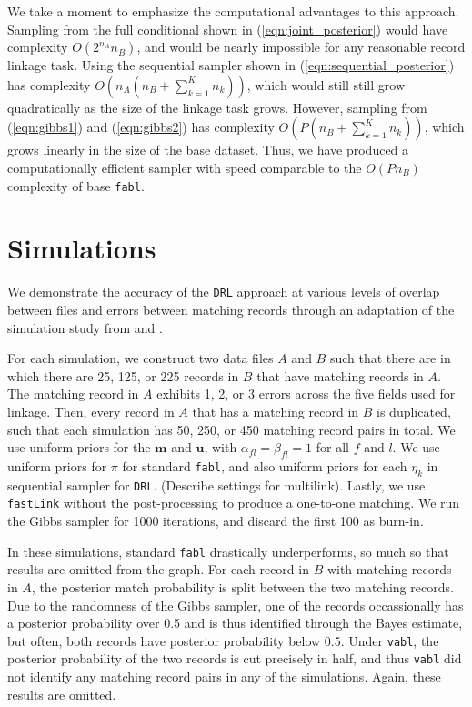 \documentclass[12pt,letterpaper]{article}
\newcommand{\1}[1]{\mathbb{I}\!\left[#1\right]} %
\def \brian#1{{\color{red} (#1)}}
\begin{document}
We take a moment to emphasize the computational advantages to this approach. Sampling from the full conditional shown in (\ref{eqn:joint_posterior}) would have complexity $O(2^{n_A}n_B)$, and would be nearly impossible for any reasonable record linkage task. Using the sequential sampler shown in (\ref{eqn:sequential_posterior}) has complexity $O\left(n_A (n_B + \sum_{k=1}^K n_k)\right)$, which would still still grow quadratically as the size of the linkage task grows. However, sampling from (\ref{eqn:gibbs1}) and (\ref{eqn:gibbs2}) has complexity $O\left(P (n_B + \sum_{k=1}^K n_k)\right)$, which grows linearly in the size of the base dataset. Thus, we have produced a computationally efficient sampler with speed comparable to the $O(P n_B)$ complexity of base \texttt{fabl}.

\section{Simulations}\label{sec:simulations}

We demonstrate the accuracy of the \texttt{DRL} approach at various levels of overlap between files and errors between matching records through an adaptation of the simulation study from \cite{sadinle_bayesian_2017} and \cite{kundinger_2023}. 

For each simulation, we construct two data files $A$ and $B$ such that there are in which there are 25, 125, or 225 records in $B$ that have matching records in $A$. The matching record in $A$ exhibits 1, 2, or 3 errors across the five fields used for linkage. Then, every record in $A$ that has a matching record in $B$ is duplicated, such that each simulation has 50, 250, or 450 matching record pairs in total. We use uniform priors for the $\bm{m}$ and $\bm{u}$, with $\alpha_{fl} = \beta_{fl} = 1$ for all $f$ and $l$. We use uniform priors for $\pi$ for standard \texttt{fabl}, and also uniform priors for each $\eta_k$ in sequential sampler for \texttt{DRL}. \brian{Describe settings for multilink}. Lastly, we use \texttt{fastLink} without the post-processing to produce a one-to-one matching. We run the Gibbs sampler for 1000 iterations, and discard the first 100 as burn-in.

In these simulations, standard \texttt{fabl} drastically underperforms, so much so that results are omitted from the graph. For each record in $B$ with matching records in $A$, the posterior match probability is split between the two matching records. Due to the randomness of the Gibbs sampler, one of the records occassionally has a posterior probability over 0.5 and is thus identified through the Bayes estimate, but often, both records have posterior probability below 0.5. Under \texttt{vabl}, the posterior probability of the two records is cut precisely in half, and thus \texttt{vabl} did not identify any matching record pairs in any of the simulations. Again, these results are omitted.
\end{document}
